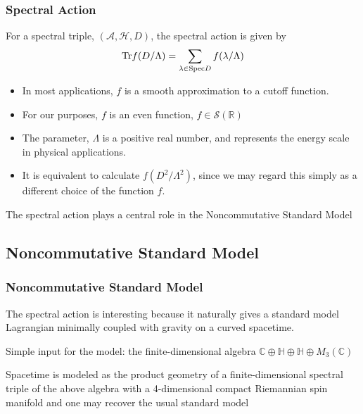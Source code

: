 \documentclass{beamer}
\def\C{{\mathbb C}}
\renewcommand{\H}{{\mathbb H}}
\def\R{{\mathbb R}}
\def\cA{{\mathcal A}}
\def\cH{{\mathcal H}}
\def\Spec{{\rm Spec}}
\def\Tr{{\rm Tr}}
\begin{document}
\begin{frame}
  \frametitle{Spectral Action}

  \begin{block}{}
    For a spectral triple, $(\cA, \cH, D)$, the spectral action is given by
    \[
    \Tr f(D / \Lambda) = \sum_{\lambda \in \Spec D} f(\lambda/\Lambda)
    \]
  \end{block}

  \pause

  \begin{itemize}
    \item In most applications, $f$ is a smooth approximation to a cutoff function.
    \item For our purposes, $f$ is an even function, $f \in \mathcal{S} (\R)$
    \item The parameter, $\Lambda$ is a positive real number, and represents the energy scale in physical applications.
    \item It is equivalent to calculate $f(D^2/ \Lambda ^2)$, since we may regard this simply as a different choice of the function $f$.
  \end{itemize}

  \pause

  \begin{block}{}
    The spectral action plays a central role in the Noncommutative Standard Model
  \end{block}

\end{frame}


\subsection{Noncommutative Standard Model}

\begin{frame}
  \frametitle{Noncommutative Standard Model}

  \begin{block}{}
    The spectral action is interesting because it naturally gives a standard model Lagrangian minimally coupled with gravity on a curved spacetime.
  \end{block}

  \pause

  \begin{block}{}
    Simple input for the model: the finite-dimensional algebra $\C \oplus \H \oplus \H \oplus M_3(\C)$
  \end{block}

  \pause

  \begin{block}{}
    Spacetime is modeled as the product geometry of a finite-dimensional spectral triple of the above algebra with a 4-dimensional compact Riemannian spin manifold and one may recover the usual standard model
  \end{block}

\end{frame}
\end{document}
